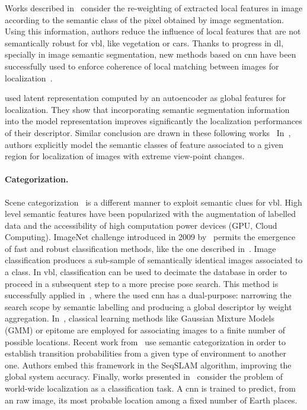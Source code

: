 			 Works described in~\citep{Arandjelovic2014a,Mousavian2015} consider the re-weighting of extracted local features in image according to the semantic class of the pixel obtained by image segmentation. Using this information, authors reduce the influence of local features that are not semantically robust for \ac{vbl}, like vegetation or cars. Thanks to progress in \ac{dl}, specially in image semantic segmentation, new methods based on \ac{cnn} have been successfully used to enforce coherence of local matching between images for localization~\citep{Shi2019,Toft2018,Taira2019}.
			 
			 \citet{Schonberger2017a} used latent representation computed by an autoencoder as global features for localization. They show that incorporating semantic segmentation information into the model representation improves significantly the localization performances of their descriptor. Similar conclusion are drawn in these following works~\citep{Seymour2018,Radwan2018} In~\citep{Garg2018,Garg2018a}, authors explicitly model the semantic classes of feature associated to a given region for localization of images with extreme view-point changes.
	    	
		\paragraph{Categorization.}
			Scene categorization~\citep{Wu2009} is a different manner to exploit semantic clues for \ac{vbl}. High level semantic features have been popularized with the augmentation of labelled data and the accessibility of high computation power devices (GPU, Cloud Computing). ImageNet challenge introduced in 2009 by~\citep{Deng2009} permits the emergence of fast and robust classification methods, like the one described in~\citep{Krizhevsky2012}. Image classification produces a sub-sample of semantically identical images associated to a class. In \ac{vbl}, classification can be used to decimate the database in order to proceed in a subsequent step to a more precise pose search. This method is successfully applied in~\citep{Sunderhauf2015}, where the used \ac{cnn} has a dual-purpose: narrowing the search scope by semantic labelling and producing a global descriptor by weight aggregation. In~\citep{torralba2003context,Ni2009}, classical learning methods like Gaussian Mixture Models (GMM) or epitome are employed for associating images to a finite number of possible locations. Recent work from~\citep{Garg2017} use semantic categorization in order to establish transition probabilities from a given type of environment to another one. Authors embed this framework in the SeqSLAM algorithm, improving the global system accuracy. Finally, works presented in~\citep{Weyand2016,Seo2018} consider the problem of world-wide localization as a classification task. A \ac{cnn} is trained to predict, from an raw image, its most probable location among a fixed number of Earth places.

